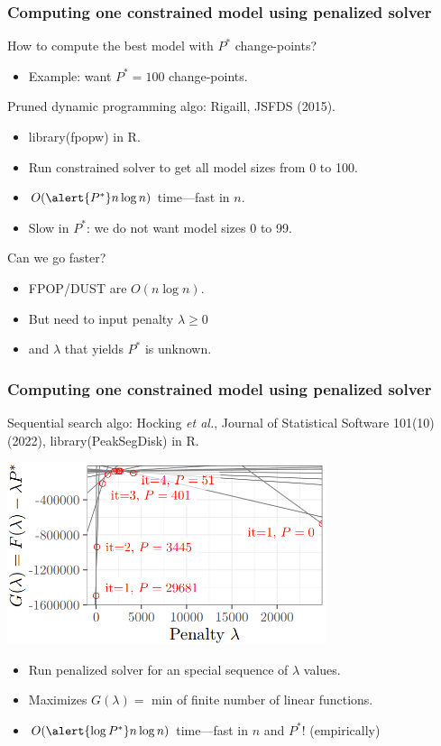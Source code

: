 \documentclass{beamer}
\begin{document}
\begin{frame}
  \frametitle{Computing one constrained model using penalized solver}

  How to compute the best model with $P^*$ change-points? 

  \begin{itemize}
  \item Example: want $P^*=100$ change-points.
  \end{itemize}

  Pruned dynamic programming algo: Rigaill, JSFDS (2015).
  \begin{itemize}
  \item library(fpopw) in R.
  \item Run \alert{constrained} solver to get all model sizes from 0 to 100.
  \item $O(\alert{P^*} n\log n)$ time---fast in $n$.
  \item Slow in $P^*$: we do not want model sizes 0 to 99.
  \end{itemize}
  Can we go faster?
  \begin{itemize}
  \item FPOP/DUST are $O(n\log n)$.
  \item But need to input penalty $\lambda\geq 0$
  \item and $\lambda$ that yields $P^*$ is unknown.
  \end{itemize}
\end{frame}
 
\begin{frame}
  \frametitle{Computing one constrained model using penalized solver}
  Sequential search algo: Hocking \emph{et al.}, Journal of Statistical Software 101(10) (2022), library(PeakSegDisk) in R.
  
  \includegraphics[width=0.7\textwidth]{figure-seq-search-iterations}
  
  \begin{itemize}
  \item Run \alert{penalized} solver for an special sequence of $\lambda$ values.
  \item Maximizes $G(\lambda)=$ min of finite number of linear functions.
  \item $O(\alert{\log P^*} n\log n)$ time---fast in $n$ and $P^*$! (empirically)
  \end{itemize}
\end{frame}
 
\end{document}
